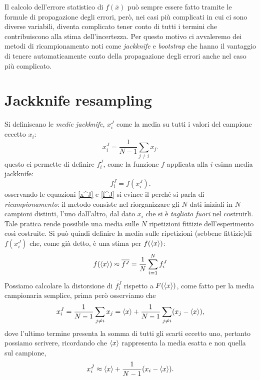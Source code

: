 \documentclass[LaM]{sapthesis}
\begin{document}
	 Il calcolo dell'errore statistico di $f(\overline{x})$ può sempre essere fatto tramite le formule di propagazione degli errori, però, nei casi più complicati in cui ci sono diverse variabili, diventa complicato tener conto di tutti i termini che contribuiscono alla stima dell'incertezza. Per questo motivo ci avvaleremo dei metodi di ricampionamento noti come \emph{jackknife} e \emph{bootstrap} che hanno il vantaggio di tenere automaticamente conto della propagazione degli errori anche nel caso più complicato.
	 
	 \section{Jackknife resampling}
	Si definiscano le \emph{medie jackknife}, $x_i^J$ come la media su tutti i valori del campione eccetto $x_i$:
	\begin{equation}\label{x^J}
		x_i^J=\frac{1}{N-1}\sum_{j\ne i}x_j.
	\end{equation}
	questo ci permette di definire $f_i^J$, come la funzione $f$ applicata alla $i$-esima media jackknife:
	\begin{equation}\label{f^J}
		f_i^J=f(x_i^J).
	\end{equation}
	osservando le equazioni \eqref{x^J} e \eqref{f^J} si evince il perché si parla di \emph{ricampionamento}: il metodo consiste nel riorganizzare gli $N$ dati iniziali in $N$ campioni distinti, l'uno dall'altro, dal dato $x_i$ che si è \emph{tagliato fuori} nel costruirli. Tale pratica rende possibile una media sulle $N$ ripetizioni fittizie dell'esperimento così costruite. Si può quindi definire la media sulle ripetizioni (sebbene fittizie)di $f(x_i^J)$ che, come già detto, è una stima per $f(\braket{x})$:
	\begin{equation}
		f(\braket{x}) \approx \overline{f^J} = \frac{1}{N}\sum_{i=1}^{N}f_i^J
	\end{equation}
	Possiamo calcolare la distorsione di $\overline{f_i^J}$ rispetto a $F(\braket{x})$, come fatto per la media campionaria semplice, prima però osserviamo che
	\begin{equation*}
		x_i^J=\frac{1}{N-1}\sum_{j\ne i}x_j = \braket{x}+\frac{1}{N-1}\sum_{j\ne i}(x_j-\braket{x}),
	\end{equation*}
	dove l'ultimo termine presenta la somma di tutti gli scarti eccetto uno, pertanto possiamo scrivere, ricordando che $\braket{x}$ rappresenta la media esatta e non quella sul campione,
	\begin{equation*}
		x_i^J\approx\braket{x}+\frac{1}{N-1}(x_i-\braket{x}).
	\end{equation*}
\end{document}
